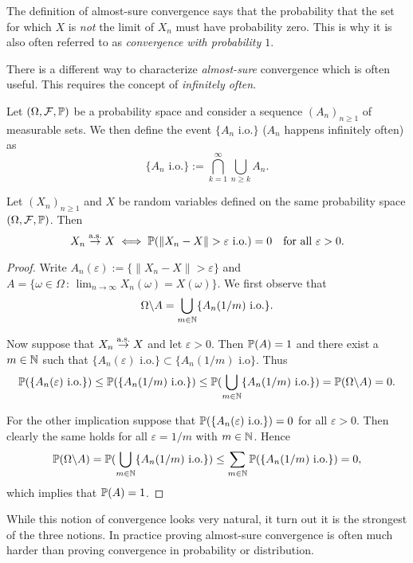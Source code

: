 The definition of almost-sure convergence says that the probability that the set for which $X$ is \emph{not} the limit of $X_n$ must have probability zero. This is why it is also often referred to as \emph{convergence with probability $1$}.

There is a different way to characterize \emph{almost-sure} convergence which is often useful. This requires the concept of \emph{infinitely often}.

\begin{definition}
Let $(\Omega, \mathcal F, \mathbb P)$ be a probability space and consider a sequence $(A_n)_{n \ge 1}$ of measurable sets. We then define the event $\{A_n \text{ i.o.}\}$ ($A_n$ happens infinitely often) as
\[
	\{A_n \text{ i.o.}\} := \bigcap_{k = 1}^\infty \bigcup_{n \ge k} A_n.
\]
\end{definition}

\begin{lemma}\label{lem:almost_sure_alternative}
Let $(X_n)_{n \ge 1}$ and $X$ be random variables defined on the same probability space $(\Omega, \mathcal F, \mathbb P)$. Then
\[
	X_n \stackrel{\mathrm{a.s.}}{\rightarrow} X \iff \mathbb P(\|X_n - X\| > \varepsilon \text{ i.o.}) = 0 \quad \text{for all } \varepsilon > 0.
\]
\end{lemma}

\begin{proof}
Write $A_n(\varepsilon) :=  \{\|X_n - X\| > \varepsilon\}$ and $A = \{\omega \in \Omega \, : \, \lim_{n \to \infty} X_n(\omega) = X(\omega)\}$. We first observe that
\[
	\Omega\backslash A = \bigcup_{m \in \mathbb N} \{A_n(1/m) \text{ i.o.}\}.
\]

Now suppose that $X_n \stackrel{\mathrm{a.s.}}{\rightarrow} X$ and let $\varepsilon > 0$. Then $\mathbb P(A) = 1$ and there exist a $m \in \mathbb N$ such that $\{A_n(\varepsilon) \text{ i.o.}\} \subset \{A_n(1/m) \text{ i.o}\}$. Thus
\[
	\mathbb P(\{A_n(\varepsilon) \text{ i.o.}\}) \le \mathbb P(\{A_n(1/m) \text{ i.o.}\}) \le \mathbb P(\bigcup_{m \in \mathbb N} \{A_n(1/m) \text{ i.o.}\}) = \mathbb P(\Omega \backslash A) = 0.
\]

For the other implication suppose that $\mathbb P(\{A_n(\varepsilon) \text{ i.o.}\}) = 0$ for all $\varepsilon > 0$. Then clearly the same holds for all $\varepsilon = 1/m$ with $m \in \mathbb N$. Hence
\[
	\mathbb P(\Omega\backslash A) = \mathbb P(\bigcup_{m \in \mathbb N} \{A_n(1/m) \text{ i.o.}\}) \le \sum_{m \in \mathbb N} \mathbb P(\{A_n(1/m) \text{ i.o.}\}) = 0,
\]
which implies that $\mathbb P(A) = 1$.
\end{proof}

While this notion of convergence looks very natural, it turn out it is the strongest of the three notions. In practice proving almost-sure convergence is often much harder than proving convergence in probability or distribution.

